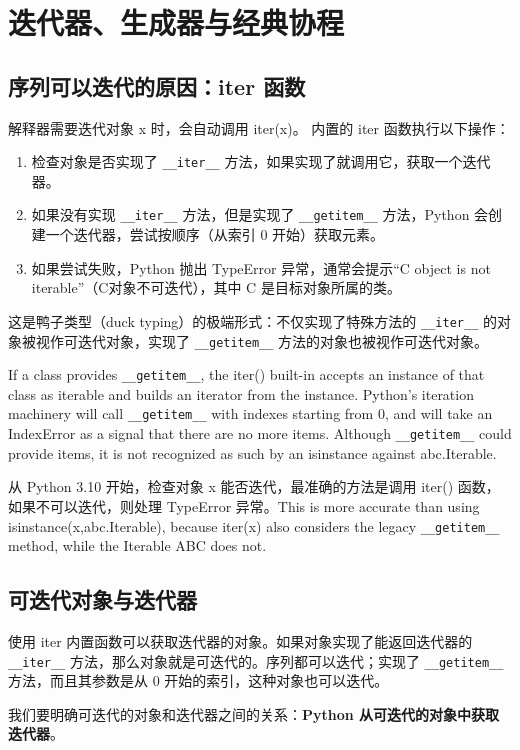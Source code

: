 \chapter{迭代器、生成器与经典协程\label{ch17}}
\section{序列可以迭代的原因：iter 函数}
解释器需要迭代对象 x 时，会自动调用 iter(x)。
内置的 iter 函数执行以下操作：
\begin{enumerate}
    \item 检查对象是否实现了 \verb|__iter__| 方法，如果实现了就调用它，获取一个迭代器。
    \item 如果没有实现 \verb|__iter__| 方法，但是实现了 \verb|__getitem__| 方法，Python 会创建一个迭代器，尝试按顺序（从索引 0 开始）获取元素。
    \item 如果尝试失败，Python 抛出 TypeError 异常，通常会提示“C object is not iterable”（C对象不可迭代），其中 C 是目标对象所属的类。
\end{enumerate}

这是鸭子类型（duck typing）的极端形式：不仅实现了特殊方法的 \verb|__iter__| 的对象被视作可迭代对象，实现了 \verb|__getitem__| 方法的对象也被视作可迭代对象。

If a class provides \verb|__getitem__|, the iter() built-in accepts an instance of that class as iterable and builds an iterator from the instance. Python’s iteration machinery will call \verb|__getitem__| with indexes starting from 0, and will take an IndexError as a signal that there are no more items. Although \verb|__getitem__| could provide items, it is not recognized as such by an isinstance against abc.Iterable.

从 Python 3.10 开始，检查对象 x 能否迭代，最准确的方法是调用 iter() 函数，如果不可以迭代，则处理 TypeError 异常。This is more accurate than using isinstance(x,abc.Iterable), because iter(x) also considers the legacy \verb|__getitem__| method, while the Iterable ABC does not.
\section{可迭代对象与迭代器}
使用 iter 内置函数可以获取迭代器的对象。如果对象实现了能返回迭代器的 \verb|__iter__| 方法，那么对象就是可迭代的。序列都可以迭代；实现了 \verb|__getitem__| 方法，而且其参数是从 0 开始的索引，这种对象也可以迭代。

我们要明确可迭代的对象和迭代器之间的关系：\textbf{Python 从可迭代的对象中获取迭代器}。

